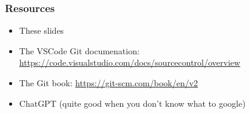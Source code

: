 \documentclass{ali-presentation}
\begin{document}
\begin{frame}
    \frametitle{Resources}

    \begin{itemize}
        \item These slides
        \item The VSCode Git documenation: \url{https://code.visualstudio.com/docs/sourcecontrol/overview}
        \item The Git book: \url{https://git-scm.com/book/en/v2}
        \item ChatGPT (quite good when you don't know what to google)
    \end{itemize}
    
\end{frame}
\end{document}
